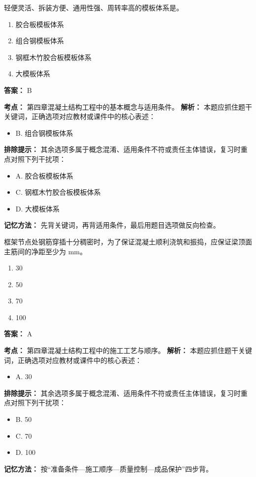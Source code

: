 \documentclass[UTF8,fontset=fandol,11pt]{ctexart}
\begin{document}
\begin{quizbox}[title={第 24 题}]
轻便灵活、拆装方便、通用性强、周转率高的模板体系是。\\
\begin{enumerate}[label=\Alph*.]
\item 胶合板模板体系
\item 组合钢模板体系
\item 钢框木竹胶合板模板体系
\item 大模板体系
\end{enumerate}
\textbf{答案：} B
\vspace{0.25em}
\begin{answerbox}[title={考点解析}]
\textbf{考点：} 第四章混凝土结构工程中的基本概念与适用条件。
\textbf{解析：} 本题应抓住题干关键词，正确选项对应教材或课件中的核心表述：
\begin{itemize}
\item B. 组合钢模板体系
\end{itemize}
\textbf{排除提示：} 其余选项多属于概念混淆、适用条件不符或责任主体错误，复习时重点对照下列干扰项：
\begin{itemize}
\item A. 胶合板模板体系
\item C. 钢框木竹胶合板模板体系
\item D. 大模板体系
\end{itemize}
\textbf{记忆方法：} 先背关键词，再背适用条件，最后用题目选项做反向检查。
\end{answerbox}
\end{quizbox}

\begin{quizbox}[title={第 25 题}]
框架节点处钢筋穿插十分稠密时，为了保证混凝土顺利浇筑和振捣，应保证梁顶面主筋间的净距至少为 mm。\\
\begin{enumerate}[label=\Alph*.]
\item 30
\item 50
\item 70
\item 100
\end{enumerate}
\textbf{答案：} A
\vspace{0.25em}
\begin{answerbox}[title={考点解析}]
\textbf{考点：} 第四章混凝土结构工程中的施工工艺与顺序。
\textbf{解析：} 本题应抓住题干关键词，正确选项对应教材或课件中的核心表述：
\begin{itemize}
\item A. 30
\end{itemize}
\textbf{排除提示：} 其余选项多属于概念混淆、适用条件不符或责任主体错误，复习时重点对照下列干扰项：
\begin{itemize}
\item B. 50
\item C. 70
\item D. 100
\end{itemize}
\textbf{记忆方法：} 按“准备条件—施工顺序—质量控制—成品保护”四步背。
\end{answerbox}
\end{quizbox}
\end{document}
